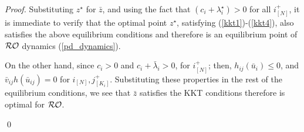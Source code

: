 \documentclass[journal,twoside,web]{ieeecolor}
\begin{document}
\begin{proof}
Substituting $z^\star$ for $\bar{z}$, and using the fact that $(c_i+\lambda_i^\star)>0$ for all $i^+_{[N]}$, it is immediate to verify that the optimal point $z^\star$, satisfying (\ref{kkt1})-(\ref{kkt4}), also satisfies the above equilibrium conditions and therefore is an equilibrium point of ${\cal RO}$ dynamics (\ref{pd_dynamics}).

On the other hand, since $c_i> 0$ and $c_i+\bar{\lambda}_i>0$,  for $i_{[N]}^+$; then, $h_{ij}(\bar{u}_i)\leq 0$, and $\bar{v}_{ij} h(\bar{u}_{ij})=0$ for $i_{[N]},j_{[K_i]}^+$. Substituting these properties in the rest of the equilibrium conditions, we see that $\bar{z}$ satisfies the KKT conditions therefore is optimal for ${\cal RO}$.

\qed
\end{proof}








\end{document}
